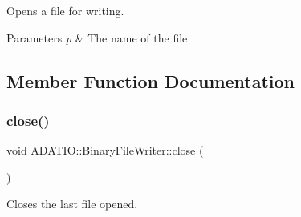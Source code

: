 Opens a file for writing. 
\begin{DoxyParams}{Parameters}
{\em p} & The name of the file \\
\hline
\end{DoxyParams}


\subsection{Member Function Documentation}
\mbox{\label{classADATIO_1_1BinaryFileWriter_a20a1bdb753aaf28e60de49e80ddf953d}} 
\subsubsection{\texorpdfstring{close()}{close()}\hspace{0.1cm}{\footnotesize\ttfamily [1/2]}}
{\footnotesize\ttfamily void A\+D\+A\+T\+I\+O\+::\+Binary\+File\+Writer\+::close (\begin{DoxyParamCaption}{ }\end{DoxyParamCaption})}



Closes the last file opened. 

